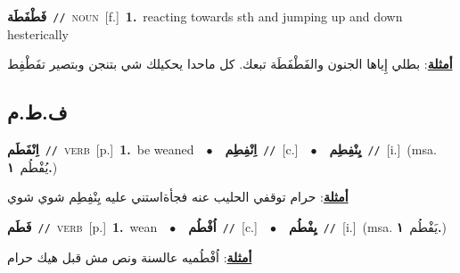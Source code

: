 \documentclass[10pt,a4paper,twoside]{article} %
\begin{document}
\begin{multicols}{2}
{\setlength\topsep{0pt}\textbf{\foreignlanguage{arabic}{فَطْفَطَة}}\ {\color{gray}\texttt{//}\color{black}}\ \textsc{noun}\ [f.]\ \textbf{1.}~reacting towards sth and jumping up and down hesterically\  \begin{flushright}\color{gray}\foreignlanguage{arabic}{\textbf{\underline{\foreignlanguage{arabic}{أمثلة}}}: بطلي إِياها الجنون والفَطْفَطَة تبعك. كل ماحدا يحكيلك شي بتنجن وبتصير تفَطْفِط}\end{flushright}\color{black}} \vspace{2mm}

\vspace{-3mm}
\subsection*{\color{blue}\foreignlanguage{arabic}{ف.ط.م}\color{blue}{}} 

{\setlength\topsep{0pt}\textbf{\foreignlanguage{arabic}{اِنْفَطَم}}\ {\color{gray}\texttt{//}\color{black}}\ \textsc{verb}\ [p.]\ \textbf{1.}~be weaned\ \ $\bullet$\ \ \setlength\topsep{0pt}\textbf{\foreignlanguage{arabic}{اِنْفِطِم}}\ {\color{gray}\texttt{//}\color{black}}\ [c.]\ \ $\bullet$\ \ \setlength\topsep{0pt}\textbf{\foreignlanguage{arabic}{يِنْفِطِم}}\ {\color{gray}\texttt{//}\color{black}}\ [i.]\ \color{gray}(msa. \foreignlanguage{arabic}{يُفْطُم}~\foreignlanguage{arabic}{\textbf{١.}})\color{black}\  \begin{flushright}\color{gray}\foreignlanguage{arabic}{\textbf{\underline{\foreignlanguage{arabic}{أمثلة}}}: حرام توقفي الحليب عنه فجأةاستني عليه يِنْفِطِم شوي شوي}\end{flushright}\color{black}} \vspace{2mm}

{\setlength\topsep{0pt}\textbf{\foreignlanguage{arabic}{فَطَم}}\ {\color{gray}\texttt{//}\color{black}}\ \textsc{verb}\ [p.]\ \textbf{1.}~wean\ \ $\bullet$\ \ \setlength\topsep{0pt}\textbf{\foreignlanguage{arabic}{اُفْطُم}}\ {\color{gray}\texttt{//}\color{black}}\ [c.]\ \ $\bullet$\ \ \setlength\topsep{0pt}\textbf{\foreignlanguage{arabic}{يِفْطُم}}\ {\color{gray}\texttt{//}\color{black}}\ [i.]\ \color{gray}(msa. \foreignlanguage{arabic}{يَفْطُم}~\foreignlanguage{arabic}{\textbf{١.}})\color{black}\  \begin{flushright}\color{gray}\foreignlanguage{arabic}{\textbf{\underline{\foreignlanguage{arabic}{أمثلة}}}: اُفْطُميه عالسنة ونص مش قبل هيك حرام}\end{flushright}\color{black}} \vspace{2mm}


\end{multicols}
\end{document}
